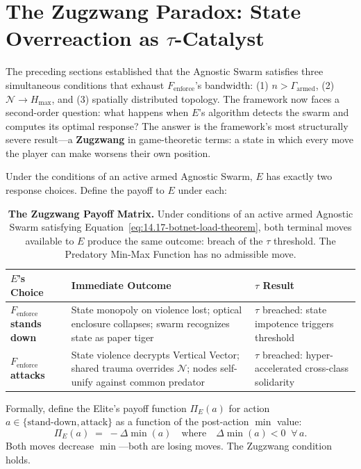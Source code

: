 \section{The Zugzwang Paradox: State Overreaction as \texorpdfstring{$\tau$}{tau}-Catalyst}
\label{sec:zugzwang}

The preceding sections established that the Agnostic Swarm satisfies three simultaneous conditions that exhaust $F_{\text{enforce}}$'s bandwidth: (1) $n > \Gamma_{\text{armed}}$, (2) $\mathcal{N} \to H_{\max}$, and (3) spatially distributed topology. The framework now faces a second-order question: what happens when $E$'s algorithm detects the swarm and computes its optimal response? The answer is the framework's most structurally severe result---a \textbf{Zugzwang} in game-theoretic terms: a state in which every move the player can make worsens their own position.

Under the conditions of an active armed Agnostic Swarm, $E$ has exactly two response choices. Define the payoff to $E$ under each:

\begin{table}[htbp]
\centering
\small
\renewcommand{\arraystretch}{1.4}
\begin{tabular}{>{\bfseries}p{4cm} p{4.5cm} p{4.5cm}}
\toprule
\textbf{$E$'s Choice} & \textbf{Immediate Outcome} & \textbf{$\tau$ Result} \\
\midrule
$F_{\text{enforce}}$ stands down & State monopoly on violence lost; optical enclosure collapses; swarm recognizes state as paper tiger & $\tau$ breached: state impotence triggers threshold \\[4pt]
$F_{\text{enforce}}$ attacks & State violence decrypts Vertical Vector; shared trauma overrides $\mathcal{N}$; nodes self-unify against common predator & $\tau$ breached: hyper-accelerated cross-class solidarity \\
\bottomrule
\end{tabular}
\caption{\textbf{The Zugzwang Payoff Matrix.} Under conditions of an active armed Agnostic Swarm satisfying Equation~\eqref{eq:14.17-botnet-load-theorem}, both terminal moves available to $E$ produce the same outcome: breach of the $\tau$ threshold. The Predatory Min-Max Function has no admissible move.}
\label{tab:zugzwang}
\end{table}

Formally, define the Elite's payoff function $\Pi_E(a)$ for action $a \in \{\text{stand-down}, \text{attack}\}$ as a function of the post-action $\min$ value:
\begin{equation}\label{eq:14.19-zugzwang-payoff-function}
\Pi_E(a) \;=\; -\Delta\min(a) \quad \text{where} \quad \Delta\min(a) < 0 \;\; \forall \, a.
\end{equation}
Both moves decrease $\min$---both are losing moves. The Zugzwang condition holds.

